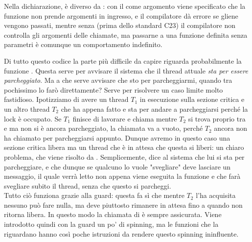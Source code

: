 \documentclass[11pt, a4paper, titlepage, oneside]{scrbook}
\begin{document}
\NB Nella dichiarazione,  è diverso da : con il  come argomento viene specificato che la funzione non prende argomenti in ingresso, e il compilatore dà errore se gliene vengono passati, mentre senza (prima dello standard C23) il compilatore non controlla gli argomenti delle chiamate, ma passarne a una funzione definita senza parametri è comunque un comportamento indefinito.

Di tutto questo codice la parte più difficile da capire riguarda probabilmente la funzione . Questa serve per avvisare il sistema che il thread attuale \textit{sta per essere parcheggiato}. Ma a che serve avvisare che sto per parcheggiarmi, quando tra pochissimo lo farò direttamente? Serve per risolvere un caso limite molto fastidioso. Ipotizziamo di avere un thread $T_1$ in esecuzione sulla sezione critica e un altro thread $T_2$ che ha appena fatto  e sta per andare a parcheggiarsi perché la lock è occupato. Se $T_1$ finisce di lavorare e chiama  mentre $T_2$ si trova proprio tra  e  ma non si è ancora parcheggiato, la chiamata  va a vuoto, perché $T_2$ ancora non ha chiamato  per parcheggiarsi appunto. Dunque avremo in questo caso una sezione critica libera ma un thread che è in attesa che questa si liberi: un chiaro problema, che viene risolto da . Semplicemente, dice al sistema che lui si sta per parcheggiare, e che dunque se qualcuno lo vuole "svegliare" deve lasciare un messaggio, il quale verrà letto non appena viene eseguita la funzione  e che farà svegliare subito il thread, senza che questo si parcheggi. \\
Tutto ciò funziona grazie alla guard: questa fa sì che mentre $T_2$ l'ha acquisita nessuno può fare nulla, ma deve piuttosto rimanere in attesa fino a quando non ritorna libera. In questo modo la chiamata di  è sempre assicurata. Viene introdotto quindi con la guard un po' di spinning, ma le funzioni che la riguardano hanno così poche istruzioni da rendere questo spinning ininfluente.
\end{document}
